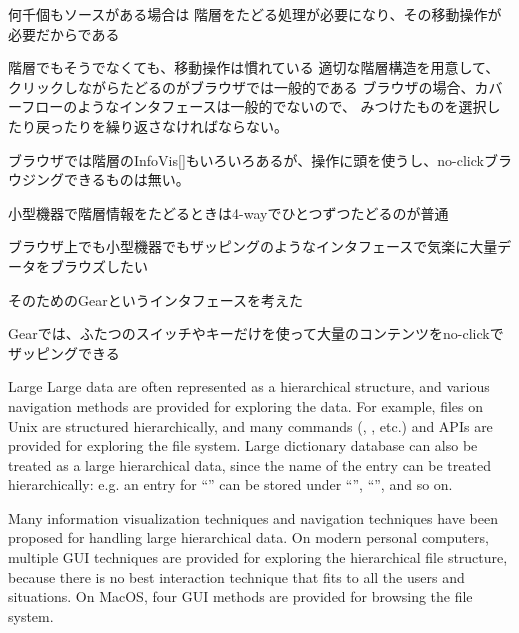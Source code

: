 \documentclass{article}
\begin{document}
何千個もソースがある場合は
階層をたどる処理が必要になり、その移動操作が必要だからである

階層でもそうでなくても、移動操作は慣れている
適切な階層構造を用意して、クリックしながらたどるのがブラウザでは一般的である
ブラウザの場合、カバーフローのようなインタフェースは一般的でないので、
みつけたものを選択したり戻ったりを繰り返さなければならない。

ブラウザでは階層のInfoVis[]もいろいろあるが、操作に頭を使うし、no-clickブラウジングできるものは無い。

小型機器で階層情報をたどるときは4-wayでひとつずつたどるのが普通

ブラウザ上でも小型機器でもザッピングのようなインタフェースで気楽に大量データをブラウズしたい

そのためのGearというインタフェースを考えた

Gearでは、ふたつのスイッチやキーだけを使って大量のコンテンツをno-clickでザッピングできる



Large Large data are often represented as a hierarchical structure, and
various navigation methods are provided for exploring the data.
For example, files on Unix are structured hierarchically, and
many commands (, , etc.) and APIs are provided for exploring the file system.
Large dictionary database can also be treated as a large
hierarchical data, since the name of the entry can be treated hierarchically:
e.g. an entry for ``'' can be stored under ``'', ``'', and so on.

Many information visualization techniques and navigation techniques
have been proposed for handling large hierarchical data.
On modern personal computers,
multiple GUI techniques are provided for
exploring the hierarchical file structure, because
there is no best interaction technique that fits to all the users and situations.
On MacOS, four GUI methods are provided for browsing the file system.

\end{document}
